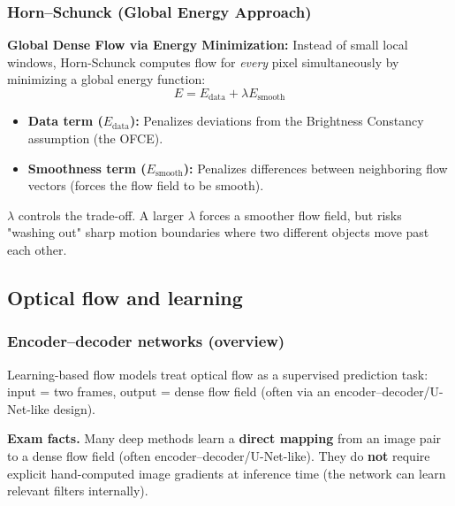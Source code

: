 \documentclass[11pt,a4paper]{article}
\begin{document}
\subsubsection{Horn--Schunck (Global Energy Approach)}

\begin{mathrule}
\textbf{Global Dense Flow via Energy Minimization:}
Instead of small local windows, Horn-Schunck computes flow for \emph{every} pixel simultaneously by minimizing a global energy function:
\[
E = E_{\text{data}} + \lambda E_{\text{smooth}}
\]
\begin{itemize}
  \item \textbf{Data term ($E_{\text{data}}$):} Penalizes deviations from the Brightness Constancy assumption (the OFCE).
  \item \textbf{Smoothness term ($E_{\text{smooth}}$):} Penalizes differences between neighboring flow vectors (forces the flow field to be smooth).
\end{itemize}
\end{mathrule}

\begin{notebox}
$\lambda$ controls the trade-off. A larger $\lambda$ forces a smoother flow field, but risks "washing out" sharp motion boundaries where two different objects move past each other.
\end{notebox}

\subsection{Optical flow and learning}

\subsubsection{Encoder--decoder networks (overview)}
\begin{defbox}
Learning-based flow models treat optical flow as a supervised prediction task:
input = two frames, output = dense flow field (often via an encoder--decoder/U-Net-like design).
\end{defbox}

\begin{notebox}
\textbf{Exam facts.} Many deep methods learn a \textbf{direct mapping} from an image pair to a dense flow field (often encoder--decoder/U-Net-like).
They do \textbf{not} require explicit hand-computed image gradients at inference time (the network can learn relevant filters internally).
\end{notebox}
\end{document}
